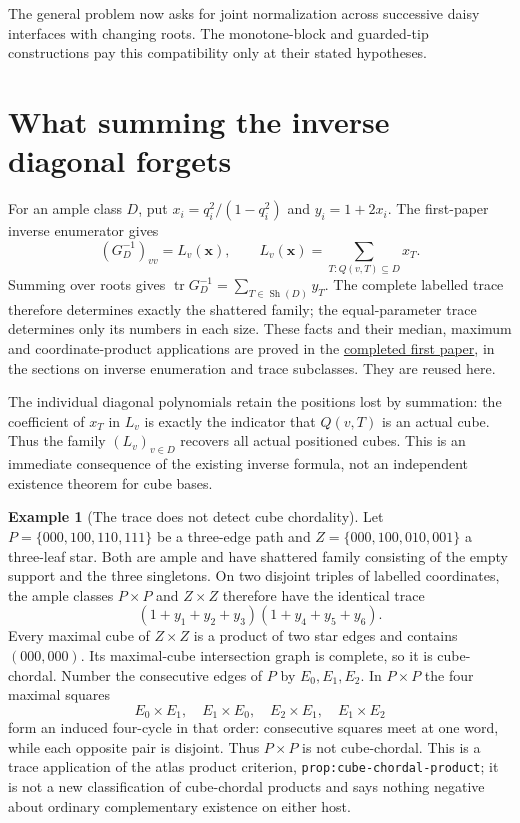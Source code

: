 \documentclass[11pt]{article}
\theoremstyle{definition}
\newtheorem{example}[theorem]{Example}
\newcommand{\Sh}{\operatorname{Sh}}
\begin{document}
The general problem now asks for joint normalization across successive
daisy interfaces with changing roots. The monotone-block and guarded-tip
constructions pay this compatibility only at their stated hypotheses.

\section{What summing the inverse diagonal forgets}
\label{sec:rooted-trace}
For an ample class $D$, put $x_i=q_i^2/(1-q_i^2)$ and
$y_i=1+2x_i$. The first-paper inverse enumerator gives
\begin{equation}\label{eq:rooted-diagonal}
 (G_D^{-1})_{vv}=L_v(\mathbf x),\qquad
 L_v(\mathbf x)=\sum_{T:Q(v,T)\subseteq D}x_T.
\end{equation}
Summing over roots gives
$\operatorname{tr}G_D^{-1}=\sum_{T\in\Sh(D)}y_T$.
The complete labelled trace therefore determines exactly the shattered
family; the equal-parameter trace determines only its numbers in each size.
These facts and their median, maximum and coordinate-product applications
are proved in the
\href{../main.pdf}{completed first paper}, in the sections on inverse
enumeration and trace subclasses. They are reused here.

The individual diagonal polynomials retain the positions lost by summation:
the coefficient of $x_T$ in $L_v$ is exactly the indicator that $Q(v,T)$
is an actual cube. Thus the family $(L_v)_{v\in D}$ recovers all actual
positioned cubes. This is an immediate consequence of the existing inverse
formula, not an independent existence theorem for cube bases.

\begin{example}[The trace does not detect cube chordality]
Let $P=\{000,100,110,111\}$ be a three-edge path and
$Z=\{000,100,010,001\}$ a three-leaf star. Both are ample and have
shattered family consisting of the empty support and the three singletons.
On two disjoint triples of labelled coordinates, the ample classes
$P\times P$ and $Z\times Z$ therefore have the identical trace
\[
 (1+y_1+y_2+y_3)(1+y_4+y_5+y_6).
\]
Every maximal cube of $Z\times Z$ is a product of two star edges and
contains $(000,000)$. Its maximal-cube intersection graph is complete,
so it is cube-chordal. Number the consecutive edges of $P$ by
$E_0,E_1,E_2$. In $P\times P$ the four maximal squares
\[
 E_0\times E_1,\quad E_1\times E_0,\quad
 E_2\times E_1,\quad E_1\times E_2
\]
form an induced four-cycle in that order: consecutive squares meet at
one word, while each opposite pair is disjoint. Thus $P\times P$ is
not cube-chordal. This is a trace application of the atlas product
criterion, \texttt{prop:cube-chordal-product}; it is not a new
classification of cube-chordal products and says nothing negative about
ordinary complementary existence on either host.
\end{example}
\end{document}
